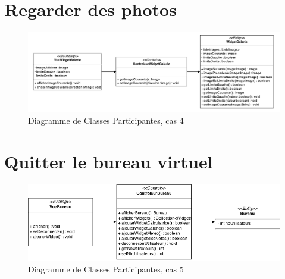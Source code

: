 \section{Regarder des photos}
\begin{figure}[H]
	\centering
	\includegraphics[angle=90]{diagrammes/DCP4.pdf}
	\caption{Diagramme de Classes Participantes, cas 4}
\end{figure}

\section{Quitter le bureau virtuel}

\begin{figure}[H]
	\centering
	\includegraphics[scale=0.6]{diagrammes/DCP5.png}
	\caption{Diagramme de Classes Participantes, cas 5}
\end{figure}